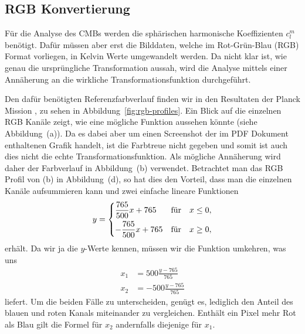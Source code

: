 \subsection{RGB Konvertierung}

Für die Analyse des CMBs werden die sphärischen harmonische Koeffizienten 
$c_l^m$ benötigt. Dafür müssen aber erst die Bilddaten, welche im Rot-Grün-Blau 
(RGB) Format vorliegen, in Kelvin Werte umgewandelt werden. Da nicht klar ist, 
wie genau die ursprüngliche Transformation aussah, wird die Analyse mittels 
einer Annäherung an die wirkliche Transformationsfunktion durchgeführt.

Den dafür benötigten Referenzfarbverlauf finden wir in den Resultaten der 
Planck Mission \cite{cmb:planck_overview}, zu sehen in 
Abbildung~\ref{fig:rgb-profiles}. Ein Blick auf die einzelnen RGB Kanäle 
zeigt, wie eine mögliche Funktion aussehen könnte (siehe 
Abbildung~(a)). Da es dabei aber um einen Screenshot 
der im PDF Dokument enthaltenen Grafik handelt, ist die Farbtreue nicht gegeben 
und somit ist auch dies nicht die echte Transformationsfunktion. Als mögliche 
Annäherung wird daher der Farbverlauf in Abbildung~(b) verwendet. 
Betrachtet man das RGB Profil von (b) in Abbildung~(d), so hat dies den 
Vorteil, dass man die einzelnen Kanäle aufsummieren kann und
zwei einfache lineare Funktionen
\begin{equation*}
	y =
	\begin{dcases}
		\frac{765}{500}x + 765 & \text{für} \quad x \leq 0,\\
		-\frac{765}{500}x + 765 & \text{für} \quad x \geq 0,\\
	\end{dcases}
\end{equation*}
erhält. Da wir ja die $y$-Werte kennen, müssen wir die Funktion umkehren, 
was uns
\begin{align*}
	x_1 &= 500\frac{y - 765}{765}\\
	x_2 &= -500\frac{y - 765}{765}
\end{align*}
liefert. Um die beiden Fälle zu unterscheiden, genügt es, lediglich den Anteil 
des blauen und roten Kanals miteinander zu vergleichen. Enthält ein Pixel mehr 
Rot als Blau gilt die Formel für $x_2$ andernfalls diejenige für $x_1$.

